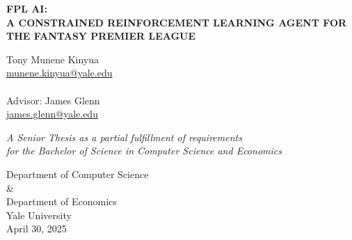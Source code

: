 \begin{titlepage}
    \begin{center}
        \vspace*{1cm}
        
        \huge
        \textbf{FPL AI: \\
        A CONSTRAINED REINFORCEMENT LEARNING AGENT FOR THE FANTASY PREMIER LEAGUE}
        
        \vspace{0.5cm}
        \LARGE
        
        \vspace{1cm}

        \Large
        Tony Munene Kinyua\\
        \href{munene.kinyua@yale.edu}{munene.kinyua@yale.edu}\\~\\
        Advisor: James Glenn\\
        \href{james.glenn@yale.edu}{james.glenn@yale.edu}
        
        \vfill
        
        \textit{A Senior Thesis as a partial fulfillment
        of requirements \\for the Bachelor of Science in Computer Science and Economics}
        
        \vspace{0.8cm}
        
        \Large
        Department of Computer Science\\
        \&\\
        Department of Economics\\
        Yale University\\
        April 30, 2025
        
    \end{center}
\end{titlepage}